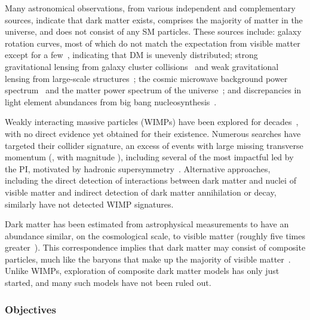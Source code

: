 Many astronomical observations, from various independent and complementary sources,
indicate that dark matter exists, comprises the majority of matter in the universe, and does not consist of any SM particles.
These sources include:
galaxy rotation curves, most of which do not match the expectation from visible matter~\cite{Rubin:1980zd,Persic:1995ru} except for a few~\cite{vanDokkum:2018vup,PinaMancera:2021wpc}, indicating that DM is unevenly distributed;
strong gravitational lensing from galaxy cluster collisions~\cite{Clowe:2006eq} and weak gravitational lensing from large-scale structures~\cite{Chang:2017kmv};
the cosmic microwave background power spectrum~\cite{Planck:2018vyg} and the matter power spectrum of the universe~\cite{Dodelson:2011qv,Planck:2018nkj};
and discrepancies in light element abundances from big bang nucleosynthesis~\cite{Pospelov:2010hj}.

Weakly interacting massive particles (WIMPs) have been explored for decades~\cite{Jungman:1995df}, with no direct evidence yet obtained for their existence.
Numerous searches have targeted their collider signature, an excess of events with large missing transverse momentum (\ptvecmiss, with magnitude \met),
including several of the most impactful led by the PI, motivated by hadronic supersymmetry~\cite{Khachatryan:2016kdk,Sirunyan:2017cwe,Sirunyan:2019hzr,Sirunyan:2019ctn,CMS:2023xlp}.
Alternative approaches, including the direct detection of interactions between dark matter and nuclei of visible matter
and indirect detection of dark matter annihilation or decay, similarly have not detected WIMP signatures.

Dark matter has been estimated from astrophysical measurements to have an abundance similar,
on the cosmological scale, to visible matter (roughly five times greater~\cite{Ade:2015xua}).
This correspondence implies that dark matter may consist of composite particles, much like the baryons that make up the majority of visible matter~\cite{Bai:2013xga,Bodas:2024idn}.
Unlike WIMPs, exploration of composite dark matter models has only just started, and many such models have not been ruled out.

\subsubsection{Objectives}\label{subsec:dmobj}

